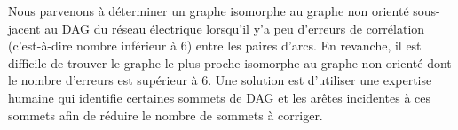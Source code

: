 Nous parvenons \`a d\'eterminer un graphe isomorphe au graphe non orient\'e sous-jacent au DAG du r\'eseau \'electrique lorsqu'il y'a peu d'erreurs de corr\'elation (c'est-\`a-dire nombre inf\'erieur  \`a $6$) entre les paires d'arcs. En revanche, il est difficile de trouver le graphe le plus proche isomorphe au graphe non orient\'e dont le nombre d'erreurs est sup\'erieur \`a $6$. 
Une solution est d'utiliser une expertise humaine qui identifie certaines sommets de DAG et les ar\^etes incidentes \`a ces sommets afin de r\'eduire le nombre de sommets \`a corriger. 